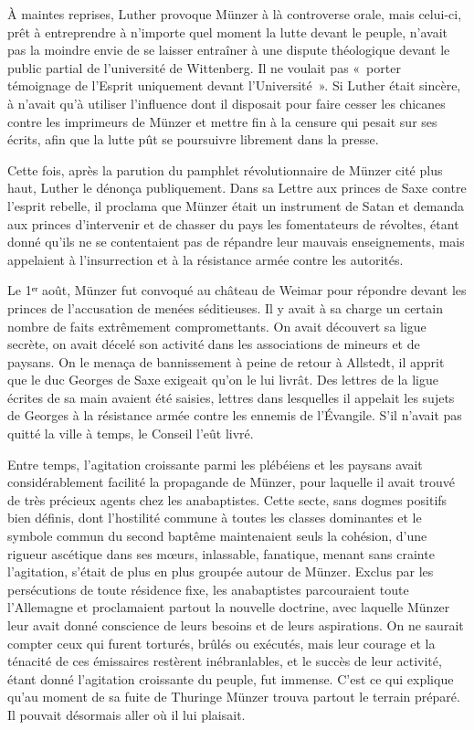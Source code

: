 \documentclass[french,twoside]{book} %
\begin{document}
\noindent À maintes reprises, Luther provoque Münzer à là controverse orale, mais celui-ci, prêt à entreprendre à n’importe quel moment la lutte devant le peuple, n’avait pas la moindre envie de se laisser entraîner à une dispute théologique devant le public partial de l’université de Wittenberg. Il ne voulait pas « porter témoignage de l’Esprit uniquement devant l’Université ». Si Luther était sincère, à n’avait qu’à utiliser l’influence dont il disposait pour faire cesser les chicanes contre les imprimeurs de Münzer et mettre fin à la censure qui pesait sur ses écrits, afin que la lutte pût se poursuivre librement dans la presse.\par
Cette fois, après la parution du pamphlet révolutionnaire de Münzer cité plus haut, Luther le dénonça publiquement. Dans sa Lettre aux princes de Saxe contre l’esprit rebelle, il proclama que Münzer était un instrument de Satan et demanda aux princes d’intervenir et de chasser du pays les fomentateurs de révoltes, étant donné qu’ils ne se contentaient pas de répandre leur mauvais enseignements, mais appelaient à l’insurrection et à la résistance armée contre les autorités.\par
Le 1ᵉʳ août, Münzer fut convoqué au château de Weimar pour répondre devant les princes de l’accusation de menées séditieuses. Il y avait à sa charge un certain nombre de faits extrêmement compromettants. On avait découvert sa ligue secrète, on avait décelé son activité dans les associations de mineurs et de paysans. On le menaça de bannissement à peine de retour à Allstedt, il apprit que le duc Georges de Saxe exigeait qu’on le lui livrât. Des lettres de la ligue écrites de sa main avaient été saisies, lettres dans lesquelles il appelait les sujets de Georges à la résistance armée contre les ennemis de l’Évangile. S’il n’avait pas quitté la ville à temps, le Conseil l’eût livré.\par
Entre temps, l’agitation croissante parmi les plébéiens et les paysans avait considérablement facilité la propagande de Münzer, pour laquelle il avait trouvé de très précieux agents chez les anabaptistes. Cette secte, sans dogmes positifs bien définis, dont l’hostilité commune à toutes les classes dominantes et le symbole commun du second baptême maintenaient seuls la cohésion, d’une rigueur ascétique dans ses mœurs, inlassable, fanatique, menant sans crainte l’agitation, s’était de plus en plus groupée autour de Münzer. Exclus par les persécutions de toute résidence fixe, les anabaptistes parcouraient toute l’Allemagne et proclamaient partout la nouvelle doctrine, avec laquelle Münzer leur avait donné conscience de leurs besoins et de leurs aspirations. On ne saurait compter ceux qui furent torturés, brûlés ou exécutés, mais leur courage et la ténacité de ces émissaires restèrent inébranlables, et le succès de leur activité, étant donné l’agitation croissante du peuple, fut immense. C’est ce qui explique qu’au moment de sa fuite de Thuringe Münzer trouva partout le terrain préparé. Il pouvait désormais aller où il lui plaisait.\par
\end{document}
